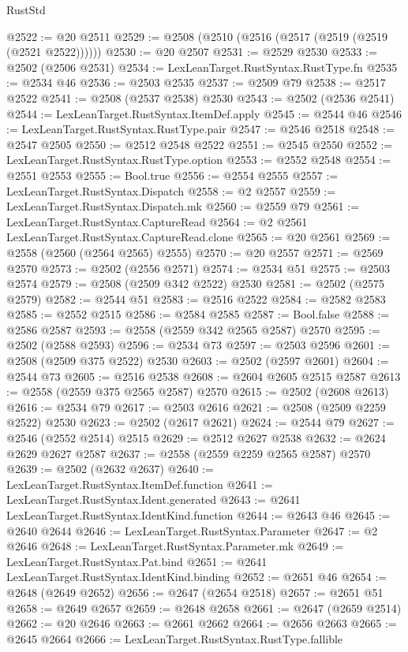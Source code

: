 \begin{lexlean}{RustStd}
\begin{coremodule}
@2522 := @20 @2511
@2529 := @2508 (@2510 (@2516 (@2517 (@2519 (@2519 (@2521 @2522))))))
@2530 := @20 @2507
@2531 := @2529 @2530
@2533 := @2502 (@2506 @2531)
@2534 := LexLeanTarget.RustSyntax.RustType.fn
@2535 := @2534 @46
@2536 := @2503 @2535
@2537 := @2509 @79
@2538 := @2517 @2522
@2541 := @2508 (@2537 @2538) @2530
@2543 := @2502 (@2536 @2541)
@2544 := LexLeanTarget.RustSyntax.ItemDef.apply
@2545 := @2544 @46
@2546 := LexLeanTarget.RustSyntax.RustType.pair
@2547 := @2546 @2518
@2548 := @2547 @2505
@2550 := @2512 @2548 @2522
@2551 := @2545 @2550
@2552 := LexLeanTarget.RustSyntax.RustType.option
@2553 := @2552 @2548
@2554 := @2551 @2553
@2555 := Bool.true
@2556 := @2554 @2555
@2557 := LexLeanTarget.RustSyntax.Dispatch
@2558 := @2 @2557
@2559 := LexLeanTarget.RustSyntax.Dispatch.mk
@2560 := @2559 @79
@2561 := LexLeanTarget.RustSyntax.CaptureRead
@2564 := @2 @2561 LexLeanTarget.RustSyntax.CaptureRead.clone
@2565 := @20 @2561
@2569 := @2558 (@2560 (@2564 @2565) @2555)
@2570 := @20 @2557
@2571 := @2569 @2570
@2573 := @2502 (@2556 @2571)
@2574 := @2534 @51
@2575 := @2503 @2574
@2579 := @2508 (@2509 @342 @2522) @2530
@2581 := @2502 (@2575 @2579)
@2582 := @2544 @51
@2583 := @2516 @2522
@2584 := @2582 @2583
@2585 := @2552 @2515
@2586 := @2584 @2585
@2587 := Bool.false
@2588 := @2586 @2587
@2593 := @2558 (@2559 @342 @2565 @2587) @2570
@2595 := @2502 (@2588 @2593)
@2596 := @2534 @73
@2597 := @2503 @2596
@2601 := @2508 (@2509 @375 @2522) @2530
@2603 := @2502 (@2597 @2601)
@2604 := @2544 @73
@2605 := @2516 @2538
@2608 := @2604 @2605 @2515 @2587
@2613 := @2558 (@2559 @375 @2565 @2587) @2570
@2615 := @2502 (@2608 @2613)
@2616 := @2534 @79
@2617 := @2503 @2616
@2621 := @2508 (@2509 @2259 @2522) @2530
@2623 := @2502 (@2617 @2621)
@2624 := @2544 @79
@2627 := @2546 (@2552 @2514) @2515
@2629 := @2512 @2627 @2538
@2632 := @2624 @2629 @2627 @2587
@2637 := @2558 (@2559 @2259 @2565 @2587) @2570
@2639 := @2502 (@2632 @2637)
@2640 := LexLeanTarget.RustSyntax.ItemDef.function
@2641 := LexLeanTarget.RustSyntax.Ident.generated
@2643 := @2641 LexLeanTarget.RustSyntax.IdentKind.function
@2644 := @2643 @46
@2645 := @2640 @2644
@2646 := LexLeanTarget.RustSyntax.Parameter
@2647 := @2 @2646
@2648 := LexLeanTarget.RustSyntax.Parameter.mk
@2649 := LexLeanTarget.RustSyntax.Pat.bind
@2651 := @2641 LexLeanTarget.RustSyntax.IdentKind.binding
@2652 := @2651 @46
@2654 := @2648 (@2649 @2652)
@2656 := @2647 (@2654 @2518)
@2657 := @2651 @51
@2658 := @2649 @2657
@2659 := @2648 @2658
@2661 := @2647 (@2659 @2514)
@2662 := @20 @2646
@2663 := @2661 @2662
@2664 := @2656 @2663
@2665 := @2645 @2664
@2666 := LexLeanTarget.RustSyntax.RustType.fallible

\end{coremodule}
\end{lexlean}
